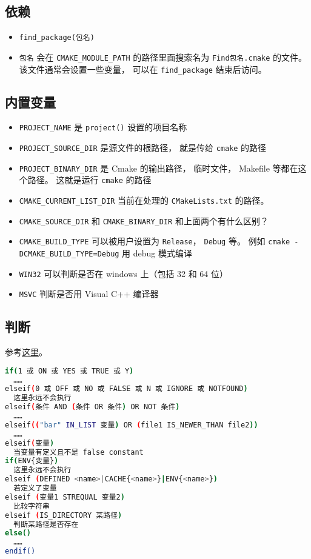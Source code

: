\subsection{依赖}
\begin{itemize}
\item \verb|find_package(包名)|
\item \verb|包名| 会在 \verb|CMAKE_MODULE_PATH| 的路径里面搜索名为 \verb|Find包名.cmake| 的文件。 该文件通常会设置一些变量， 可以在 \verb|find_package| 结束后访问。
\end{itemize}


\subsection{内置变量}
\begin{itemize}
\item \verb|PROJECT_NAME| 是 \verb|project()| 设置的项目名称
\item \verb`PROJECT_SOURCE_DIR` 是源文件的根路径， 就是传给 \verb`cmake` 的路径
\item \verb`PROJECT_BINARY_DIR` 是 Cmake 的输出路径， 临时文件， Makefile 等都在这个路径。 这就是运行 \verb`cmake` 的路径
\item \verb|CMAKE_CURRENT_LIST_DIR| 当前在处理的 \verb|CMakeLists.txt| 的路径。
\item \verb|CMAKE_SOURCE_DIR| 和 \verb|CMAKE_BINARY_DIR| 和上面两个有什么区别？
\item \verb|CMAKE_BUILD_TYPE| 可以被用户设置为 \verb|Release|， \verb|Debug| 等。 例如 \verb|cmake -DCMAKE_BUILD_TYPE=Debug| 用 debug 模式编译
\item \verb|WIN32| 可以判断是否在 windows 上（包括 32 和 64 位）
\item \verb|MSVC| 判断是否用 Visual C++ 编译器
\end{itemize}

\subsection{判断}
参考\href{https://cmake.org/cmake/help/latest/command/if.html}{这里}。
\begin{lstlisting}[language=bash]
if(1 或 ON 或 YES 或 TRUE 或 Y)
  ……
elseif(0 或 OFF 或 NO 或 FALSE 或 N 或 IGNORE 或 NOTFOUND)
  这里永远不会执行
elseif(条件 AND (条件 OR 条件) OR NOT 条件)
  ……
elseif(("bar" IN_LIST 变量) OR (file1 IS_NEWER_THAN file2))
  ……
elseif(变量)
  当变量有定义且不是 false constant
if(ENV{变量})
  这里永远不会执行
elseif (DEFINED <name>|CACHE{<name>}|ENV{<name>})
  若定义了变量
elseif (变量1 STREQUAL 变量2)
  比较字符串
elseif (IS_DIRECTORY 某路径)
  判断某路径是否存在
else()
  ……
endif()
\end{lstlisting}

